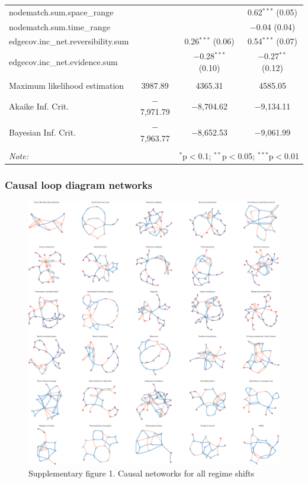 \documentclass[9pt,]{article}
\begin{document}
\begin{tabular}{@{\extracolsep{5pt}}lccc}
  nodematch.sum.space\_range &  &  & 0.62$^{***}$ (0.05) \\ 
  nodematch.sum.time\_range &  &  & $-$0.04 (0.04) \\ 
  edgecov.inc\_net.reversibility.sum &  & 0.26$^{***}$ (0.06) & 0.54$^{***}$ (0.07) \\ 
  edgecov.inc\_net.evidence.sum &  & $-$0.28$^{***}$ (0.10) & $-$0.27$^{**}$ (0.12) \\ 
 \hline \\[-1.8ex] 
Maximum likelihood estimation & 3987.89 & 4365.31 & 4585.05 \\ 
Akaike Inf. Crit. & $-$7,971.79 & $-$8,704.62 & $-$9,134.11 \\ 
Bayesian Inf. Crit. & $-$7,963.77 & $-$8,652.53 & $-$9,061.99 \\ 
\hline 
\hline \\[-1.8ex] 
\textit{Note:}  & \multicolumn{3}{r}{$^{*}$p$<$0.1; $^{**}$p$<$0.05; $^{***}$p$<$0.01} \\ 
\end{tabular}

\endgroup 

\pagebreak

\subsubsection{Causal loop diagram
networks}\label{causal-loop-diagram-networks}

\begin{figure}

{\centering \includegraphics{170417_draft_files/figure-latex/supp1-1} 

}

\caption{Supplementary figure 1. Causal netoworks for all regime shifts}\label{fig:supp1}
\end{figure}
\end{document}
